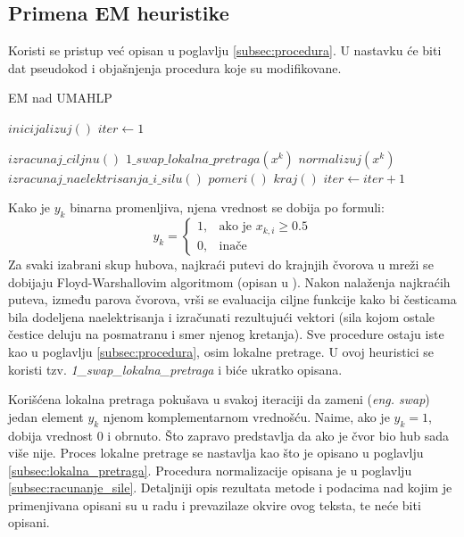 \documentclass[a4paper]{article}
\begin{document}
\subsection{Primena EM heuristike}
\label{subsec:primena}

Koristi se pristup već opisan u poglavlju \ref{subsec:procedura}. U nastavku će biti dat pseudokod i objašnjenja procedura koje su modifikovane.

\begin{algorithm}[H]
\label{alg:umahlp}
\caption{EM nad UMAHLP}
\begin{algorithmic}[1]
\STATE $inicijalizuj()$
\STATE $iter \leftarrow 1$

\STATE $izracunaj\_ciljnu()$
\STATE $1\_swap\_lokalna\_pretraga(x^k)$
\STATE $normalizuj(x^k)$
\ENDFOR
\STATE $izracunaj\_naelektrisanja\_i\_silu()$
\STATE $pomeri()$
\STATE $kraj()$
\ENDIF
\STATE $iter \leftarrow iter + 1$
\ENDWHILE
\end{algorithmic}
\end{algorithm}
Kako je $y_k$ binarna promenljiva, njena vrednost se dobija po formuli:
\[ y_k = \begin{cases}
1,& \text{ako je } x_{k, i} \geq 0.5 \\
0,& \text{inače}
\end{cases}\]
Za svaki izabrani skup hubova, najkraći putevi do krajnjih čvorova u mreži se dobijaju Floyd-Warshallovim algoritmom (opisan u \cite{flojd-warsall}). Nakon nalaženja najkraćih puteva, između parova čvorova, vrši se evaluacija ciljne funkcije kako bi česticama bila dodeljena naelektrisanja i izračunati rezultujući vektori (sila kojom ostale čestice deluju na posmatranu i smer njenog kretanja). Sve procedure ostaju iste kao u poglavlju \ref{subsec:procedura}, osim lokalne pretrage. U ovoj heuristici se koristi tzv. \textit{1\_swap\_lokalna\_pretraga} i biće ukratko opisana.

Korišćena lokalna pretraga pokušava u svakoj iteraciji da zameni (\textit{eng. swap}) jedan element $y_k$ njenom komplementarnom vrednošću. Naime, ako je $y_k = 1$, dobija vrednost 0 i obrnuto. Što zapravo predstavlja da ako je čvor bio hub sada više nije. Proces lokalne pretrage se nastavlja kao što je opisano u poglavlju \ref{subsec:lokalna_pretraga}. Procedura normalizacije opisana je u poglavlju \ref{subsec:racunanje_sile}. 
Detaljniji opis rezultata metode i podacima nad kojim je primenjivana opisani su u radu \cite{UMAHLP} i prevazilaze okvire ovog teksta, te neće biti opisani.
\end{document}
